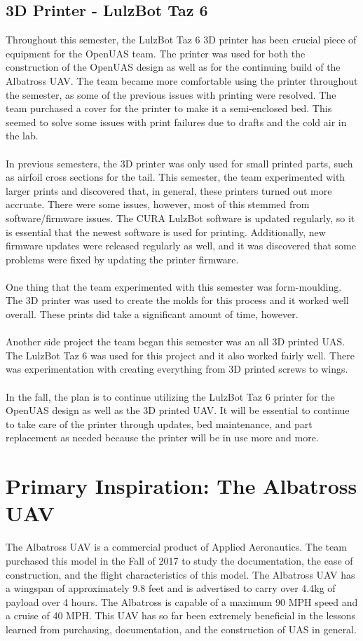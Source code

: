 \documentclass{article}
\begin{document}
\subsection{3D Printer - LulzBot Taz 6}
Throughout this semester, the LulzBot Taz 6 3D printer has been crucial piece of equipment for the OpenUAS team. The printer was used for both the construction of the OpenUAS design as well as for the continuing build of the Albatross UAV. The team became more comfortable using the printer throughout the semester, as some of the previous issues with printing were resolved. The team purchased a cover for the printer to make it a semi-enclosed bed. This seemed to solve some issues with print failures due to drafts and the cold air in the lab. \\\\
In previous semesters, the 3D printer was only used for small printed parts, such as airfoil cross sections for the tail. This semester, the team experimented with larger prints and discovered that, in general, these printers turned out more accruate. There were some issues, however, most of this stemmed from software/firmware issues. The CURA LulzBot software is updated regularly, so it is essential that the newest software is used for printing. Additionally, new firmware updates were released regularly as well, and it was discovered that some problems were fixed by updating the printer firmware. \\\\
One thing that the team experimented with this semester was form-moulding. The 3D printer was used to create the molds for this process and it worked well overall. These prints did take a significant amount of time, however.\\\\
Another side project the team began this semester was an all 3D printed UAS. The LulzBot Taz 6 was used for this project and it also worked fairly well. There was experimentation with creating everything from 3D printed screws to wings. \\\\
In the fall, the plan is to continue utilizing the LulzBot Taz 6 printer for the OpenUAS design as well as the 3D printed UAV. It will be essential to continue to take care of the printer through updates, bed maintenance, and part replacement as needed because the printer will be in use more and more. 

\section{Primary Inspiration: The Albatross UAV}
\noindent The Albatross UAV is a commercial product of Applied Aeronautics. The team purchased this model in the Fall of 2017 to study the documentation, the ease of construction, and the flight characteristics of this model. The Albatross UAV has a wingspan of approximately 9.8 feet and is advertised to carry over 4.4kg of payload over 4 hours. The Albatross is capable of a maximum 90 MPH speed and a cruise of 40 MPH. This UAV has so far been extremely beneficial in the lessons learned from purchasing, documentation, and the construction of UAS in general. 
\end{document}
